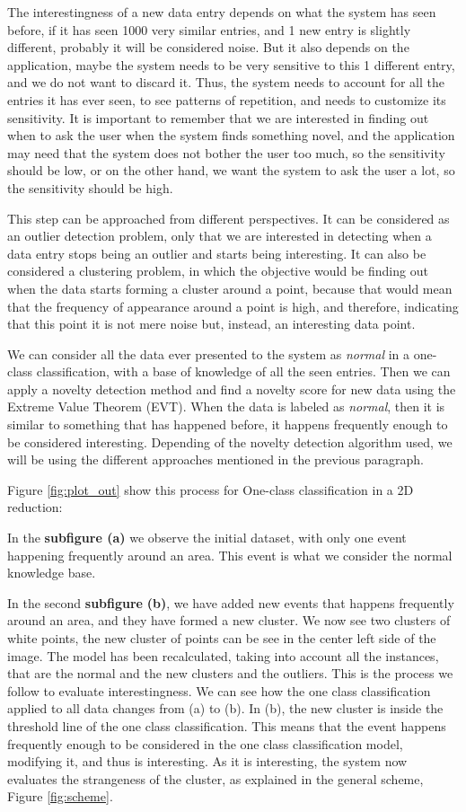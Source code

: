 The interestingness of a new data entry depends on what the system has seen before, if it has seen 1000 very similar entries, and 1 new entry is slightly different, probably it will be considered noise. But it also depends on the application, maybe the system needs to be very sensitive to this 1 different entry, and we do not want to discard it. Thus, the system needs to account for all the entries it has ever seen, to see patterns of repetition, and needs to customize its sensitivity. It is important to remember that we are interested in finding out when to ask the user when the system finds something novel, and the application may need that the system does not bother the user too much, so the sensitivity should be low, or on the other hand, we want the system to ask the user a lot, so the sensitivity should be high.

This step can be approached from different perspectives. It can be considered as an outlier detection problem, only that we are interested in detecting when a data entry stops being an outlier and starts being interesting. It can also be considered a clustering problem, in which the objective would be finding out when the data starts forming a cluster around a point, because that would mean that the frequency of appearance around a point is high, and therefore, indicating that this point it is not mere noise but, instead, an interesting data point. 

We can consider all the data ever presented to the system as \emph{normal} in a one-class classification, with a base of knowledge of all the seen entries. Then we can apply a novelty detection method and find a novelty score for new data using the Extreme Value Theorem (EVT). When the data is labeled as \emph{normal}, then it is similar to something that has happened before, it happens frequently enough to be considered interesting. Depending of the novelty detection algorithm used, we will be using the different approaches mentioned in the previous paragraph. 

Figure \ref{fig:plot_out} show this process for One-class classification in a 2D reduction:

In the \textbf{subfigure (a)} we observe the initial dataset, with only one event happening frequently around an area. This event is what we consider the normal knowledge base.

In the second \textbf{subfigure} \textbf{(b)}, we have added new events that happens frequently around an area, and they have formed a new cluster. We now see two clusters of white points, the new cluster of points can be see in the center left side of the image. The model has been recalculated, taking into account all the instances, that are the normal and the new clusters and the outliers. This is the process we follow to evaluate interestingness. We can see how the one class classification applied to all data changes from (a) to (b). In (b), the new cluster is inside the threshold line of the one class classification. This means that the event happens frequently enough to be considered in the one class classification model, modifying it, and thus is interesting. As it is interesting, the system now evaluates the strangeness of the cluster, as explained in the general scheme, Figure \ref{fig:scheme}. 

